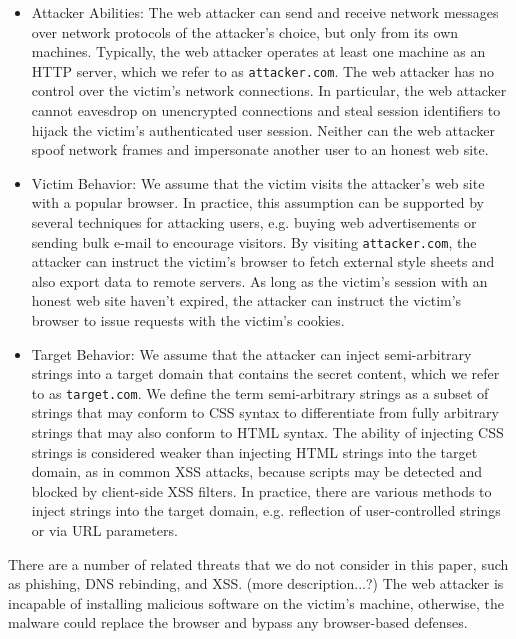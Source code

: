 \documentclass{acm_proc_article-sp}
\begin{document}
\begin{itemize}

\item{Attacker Abilities:}
The web attacker can send and receive network messages over network protocols of the attacker's choice, but only from its own machines. Typically, the web attacker operates at least one machine as an HTTP server, which we refer to as \texttt{attacker.com}. The web attacker has no control over the victim's network connections. In particular, the web attacker cannot eavesdrop on unencrypted connections and steal session identifiers to hijack the victim's authenticated user session. Neither can the web attacker spoof network frames and impersonate another user to an honest web site.

\item{Victim Behavior:}
We assume that the victim visits the attacker's web site with a popular browser. In practice, this assumption can be supported by several techniques for attacking users, e.g. buying web advertisements or sending bulk e-mail to encourage visitors. By visiting \texttt{attacker.com}, the attacker can instruct the victim's browser to fetch external style sheets and also export data to remote servers. As long as the victim's session with an honest web site haven't expired, the attacker can instruct the victim's browser to issue requests with the victim's cookies.

\item{Target Behavior:}
We assume that the attacker can inject semi-arbitrary strings into a target domain that contains the secret content, which we refer to as \texttt{target.com}. We define the term semi-arbitrary strings as a subset of strings that may conform to CSS syntax to differentiate from fully arbitrary strings that may also conform to HTML syntax. The ability of injecting CSS strings is considered weaker than injecting HTML strings into the target domain, as in common XSS attacks, because scripts may be detected and blocked by client-side XSS filters. In practice, there are various methods to inject strings into the target domain, e.g. reflection of user-controlled strings or via URL parameters.

\end{itemize}

There are a number of related threats that we do not consider in this paper, such as phishing, DNS rebinding, and XSS.
(more description...?)
The web attacker is incapable of installing malicious software on the victim's machine, otherwise, the malware could replace the browser and bypass any browser-based defenses.
\end{document}
